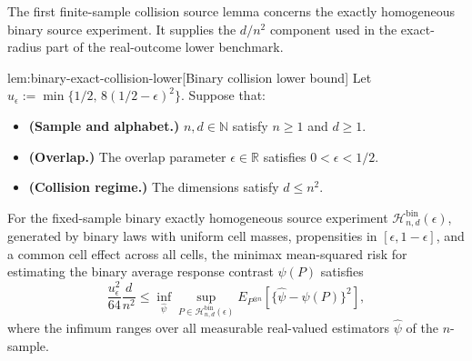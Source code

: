 \documentclass[11pt]{article}
\begin{document}
The first finite-sample collision source lemma concerns the exactly homogeneous binary source experiment. It supplies the \(d/n^2\) component used in the exact-radius part of the real-outcome lower benchmark.

\begin{lemmav}{lem:binary-exact-collision-lower}[Binary collision lower bound]
Let \(u_{\epsilon}:=\min\{1/2,\,8(1/2-\epsilon)^2\}\).  Suppose that:
\begin{itemize}
\item \textbf{(Sample and alphabet.)} \(n,d\in\mathbb N\) satisfy \(n\ge 1\) and \(d\ge 1\).
\item \textbf{(Overlap.)} The overlap parameter \(\epsilon\in\mathbb R\) satisfies \(0<\epsilon<1/2\).
\item \textbf{(Collision regime.)} The dimensions satisfy \(d\le n^2\).
\end{itemize}
For the fixed-sample binary exactly homogeneous source experiment \(\mathcal H_{n,d}^{\mathrm{bin}}(\epsilon)\), generated by binary laws with uniform cell masses, propensities in \([\epsilon,1-\epsilon]\), and a common cell effect across all cells, the minimax mean-squared risk for estimating the binary average response contrast \(\psi(P)\) satisfies
\[
\frac{u_{\epsilon}^2}{64}\frac{d}{n^2}
\le
\inf_{\widehat\psi}
\sup_{P\in\mathcal H_{n,d}^{\mathrm{bin}}(\epsilon)}
E_{P^{\otimes n}}\!\left[\{\widehat\psi-\psi(P)\}^2\right],
\]
where the infimum ranges over all measurable real-valued estimators \(\widehat\psi\) of the \(n\)-sample.
\end{lemmav}
\end{document}
